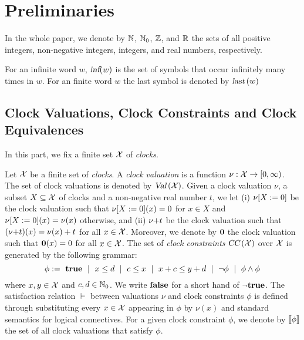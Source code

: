 \section{Preliminaries}
In the whole paper, we denote by $\mathbb{N}$, $\mathbb{N}_0$, $\mathbb{Z}$, and $\mathbb{R}$ the sets of all positive
integers, non-negative integers, integers, and real numbers, respectively.

For an infinite word $w$, $\mbox{\sl inf} ( w )$ is the set of symbols that occur infinitely many times in $w$.
For an finite word $w$ {\color{red} the last symbol is denoted by $\mbox{\sl last}\left(w\right)$}

%
\subsection{Clock Valuations, Clock Constraints and Clock Equivalences}
%
In this part, we fix a finite set $\mathcal{X}$ of \emph{clocks}.

\smallskip {} Let $\mathcal{X}$ be a finite set of \emph{clocks}.
A \emph{clock valuation} is a function $\nu:\mathcal{X}\rightarrow [0,\infty)$. The set of clock valuations
is denoted by $\mbox{\sl Val}\left(\mathcal{X}\right)$.
Given a clock valuation $\nu$, a subset $X\subseteq\mathcal{X}$ of clocks and a non-negative real number $t$, we let (i) ${\nu}{\left[X:=0\right]}$ be the clock valuation such that ${\nu}{\left[X:=0\right]}(x)=0$ for $x\in X$ and ${\nu}{\left[X:=0\right]}(x)=\nu(x)$ otherwise, and (ii) ${\nu}{+}{t}$ be the clock valuation such that $({\nu}{+}{t})(x)=\nu(x)+t$ for all $x\in\mathcal{X}$.
Moreover, we denote by $\mathbf{0}$ the clock valuation such that $\mathbf{0}(x)=0$ for all $x\in\mathcal{X}$.
\smallskip {} The set of \emph{clock constraints} $\mbox{\sl CC}\left(\mathcal{X}\right)$ over $\mathcal{X}$ is generated by the following grammar:
\[
\phi:=~\mathbf{true}~\mid~x\le d~\mid ~c\le x~\mid~x+c\le y+d~\mid ~\neg\phi~\mid~\phi\wedge\phi
\]
where $x,y\in\mathcal{X}$ and $c,d\in\mathbb{N}_0$.
We write $\mathbf{false}$ for a short hand of $\neg\mathbf{true}$.
The satisfaction relation $\models$ between valuations $\nu$ and clock constraints $\phi$ is defined through substituting every $x\in\mathcal{X}$ appearing in $\phi$ by $\nu(x)$ and standard semantics for logical connectives.
For a given clock constraint $\phi$, we denote by ${\llbracket}{\phi}{\rrbracket}$ the set of all clock valuations that satisfy $\phi$.

